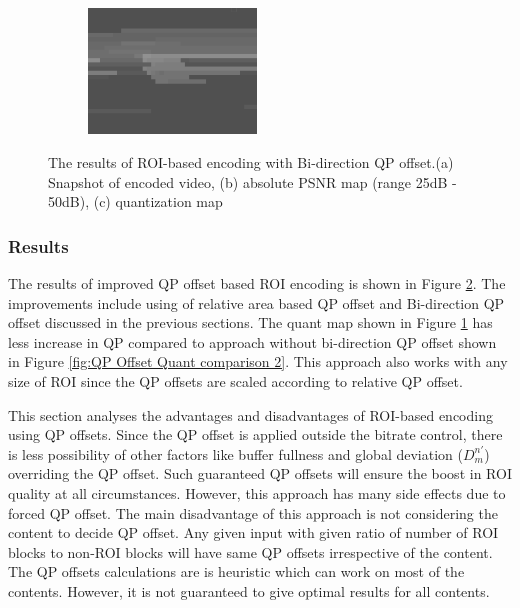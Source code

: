 \documentclass[11pt]{article} %
\begin{document}
\begin{figure}
\begin{subfigure}[t]{\textwidth}
	\centering
	\includegraphics[width=0.49\textwidth]{QPOffset/Bi_direction/Paul250kbps_uni_QP_offset_Bi_4_quant.png}
	\caption{}
	\label{fig:Bi-direction QP offset result quant}
	\end{subfigure}
	\caption{The results of ROI-based encoding with Bi-direction QP offset.(a) Snapshot of encoded video, (b) absolute PSNR map (range 25dB - 50dB), (c) quantization map}
	\label{fig:Bi-direction QP offset result}
\end{figure}

\subsubsection{Results}
The results of improved QP offset based ROI encoding is shown in Figure \ref{fig:Bi-direction QP offset result}. The improvements include using of relative area based QP offset and Bi-direction QP offset discussed in the previous sections. The quant map shown in Figure \ref{fig:Bi-direction QP offset result quant} has less increase in QP compared to approach without bi-direction QP offset shown in Figure \ref{fig:QP Offset Quant comparison 2}. This approach also works with any size of ROI since the QP offsets are scaled according to relative QP offset.
 
This section analyses the advantages and disadvantages of ROI-based encoding using QP offsets. Since the QP offset is applied outside the bitrate control, there is less possibility of other factors like buffer fullness and global deviation ($D_m^{n'}$) overriding the QP offset. Such guaranteed QP offsets will ensure the boost in ROI quality at all circumstances. However, this approach has many side effects due to forced QP offset. The main disadvantage of this approach is not considering the content to decide QP offset. Any given input with given ratio of number of ROI blocks to non-ROI blocks will have same QP offsets irrespective of the content. The QP offsets calculations are is heuristic which can work on most of the contents. However, it is not guaranteed to give optimal results for all contents.
\end{document}
